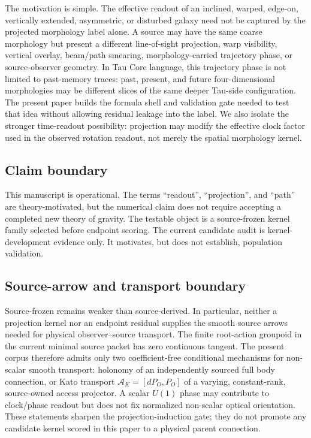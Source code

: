 \documentclass[11pt]{article}
\begin{document}
The motivation is simple.  The effective readout of an inclined, warped,
edge-on, vertically extended, asymmetric, or disturbed galaxy need not be
captured by the projected morphology label alone.  A source may have the same
coarse morphology but present a different line-of-sight projection, warp
visibility, vertical overlay, beam/path smearing, morphology-carried trajectory
phase, or source-observer geometry.  In Tau Core language, this trajectory
phase is not limited to past-memory traces: past, present, and future
four-dimensional morphologies may be different slices of the same deeper
Tau-side configuration.  The present paper builds the formula shell and
validation gate needed to test that idea without allowing residual leakage into
the label.  We also isolate the stronger time-readout possibility: projection
may modify the effective clock factor used in the observed rotation readout,
not merely the spatial morphology kernel.

\subsection{Claim boundary}

This manuscript is operational.  The terms ``readout'', ``projection'', and
``path'' are theory-motivated, but the numerical claim does not require
accepting a completed new theory of gravity.  The testable object is a
source-frozen kernel family selected before endpoint scoring.  The current
candidate audit is kernel-development evidence only.  It motivates, but does
not establish, population validation.

\subsection{Source-arrow and transport boundary}

Source-frozen remains weaker than source-derived. In particular, neither a
projection kernel nor an endpoint residual supplies the smooth source arrows
needed for physical observer--source transport. The finite root-action
groupoid in the current minimal source packet has zero continuous tangent.
The present corpus therefore admits only two coefficient-free conditional
mechanisms for non-scalar smooth transport: holonomy of an independently
sourced full body connection, or Kato transport
\(\mathcal A_K=[dP_O,P_O]\) of a varying, constant-rank, source-owned access
projector. A scalar \(U(1)\) phase may contribute to clock/phase readout but
does not fix normalized non-scalar optical orientation. These statements
sharpen the projection-induction gate; they do not promote any candidate
kernel scored in this paper to a physical parent connection.
\end{document}
